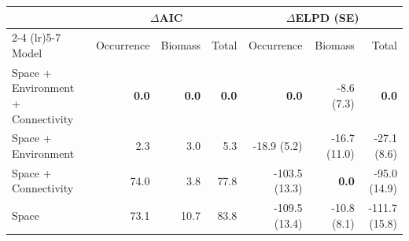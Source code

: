 \begin{tabular}{lrrrrrr}
\toprule
 & \multicolumn{3}{c}{$\Delta$AIC} & \multicolumn{3}{c}{$\Delta$ELPD (SE)} \\
\cmidrule(lr){2-4} \cmidrule(lr){5-7}
Model & Occurrence & Biomass & Total & Occurrence & Biomass & Total \\
\midrule
Space + Environment + Connectivity & \textbf{0.0} & \textbf{0.0} & \textbf{0.0} & \textbf{0.0} & -8.6 (7.3) & \textbf{0.0} \\
Space + Environment & 2.3 & 3.0 & 5.3 & -18.9 (5.2) & -16.7 (11.0) & -27.1 (8.6) \\
Space + Connectivity & 74.0 & 3.8 & 77.8 & -103.5 (13.3) & \textbf{0.0} & -95.0 (14.9) \\
Space & 73.1 & 10.7 & 83.8 & -109.5 (13.4) & -10.8 (8.1) & -111.7 (15.8) \\
\bottomrule
\end{tabular}
